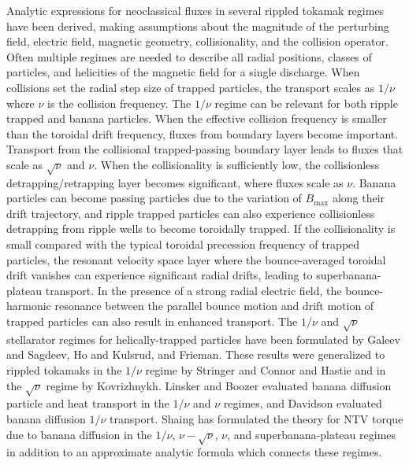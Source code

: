 \documentclass[aip, pop, preprint]{revtex4-1}
\numberwithin{figure}{section}
\numberwithin{equation}{section}
\begin{document}
Analytic expressions for neoclassical fluxes in several rippled tokamak regimes have been derived, making assumptions about the magnitude of the perturbing field, electric field, magnetic geometry, collisionality, and the collision operator. Often multiple regimes are needed to describe all radial positions, classes of particles, and helicities of the magnetic field for a single discharge. When collisions set the radial step size of trapped particles, the transport scales as $1/\nu$ where $\nu$ is the collision frequency. The $1/\nu$ regime can be relevant for both ripple trapped and banana particles. When the effective collision frequency is smaller than the toroidal drift frequency, fluxes from boundary layers become important. Transport from the collisional trapped-passing boundary layer leads to fluxes that scale as $\sqrt{\nu}$ and $\nu$. When the collisionality is sufficiently low, the collisionless detrapping/retrapping layer becomes significant, where fluxes scale as $\nu$. Banana particles can become passing particles due to the variation of $B_{\max}$ along their drift trajectory,\cite{Shaing2009} and ripple trapped particles can also experience collisionless detrapping from ripple wells to become toroidally trapped.\cite{Shaing1982a, Shaing1982b} If the collisionality is small compared with the typical toroidal precession frequency of trapped particles, the resonant velocity space layer where the bounce-averaged toroidal drift vanishes can experience significant radial drifts, leading to superbanana-plateau transport.\cite{Shaing2009_sbp} In the presence of a strong radial electric field, the bounce-harmonic resonance between the parallel bounce motion and drift motion of trapped particles can also result in enhanced transport.\cite{Linsker1982,Park2009} The $1/\nu$ and $\sqrt{\nu}$ stellarator regimes for helically-trapped particles have been formulated by Galeev and Sagdeev,\cite{Galeev1969} Ho and Kulsrud,\cite{Ho1987} and Frieman.\cite{Frieman1970} These results were generalized to rippled tokamaks in the $1/\nu$ regime by Stringer \cite{Stringer1972} and Connor and Hastie\cite{Connor1973} and in the $\sqrt{\nu}$ regime by Kovrizhnykh.\cite{Kovrizhnykh1984} Linsker and Boozer \cite{Linsker1982} evaluated banana diffusion particle and heat transport in the $1/\nu$ and $\nu$ regimes, and Davidson\cite{Davidson1976} evaluated banana diffusion $1/\nu$ transport. Shaing has formulated the theory for NTV torque due to banana diffusion in the $1/\nu$,\cite{Shaing2003} $\nu-\sqrt{\nu}$,\cite{Shaing2008} $\nu$,\cite{Shaing2009} and superbanana-plateau \cite{Shaing2009_sbp} regimes in addition to an approximate analytic formula which connects these regimes.\cite{Shaing2010}
\end{document}
